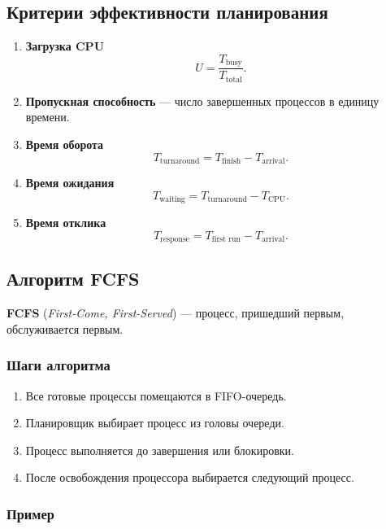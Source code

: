 \documentclass[12pt,a4paper]{article}
\begin{document}
\subsection{Критерии эффективности планирования}

\begin{enumerate}
    \item \textbf{Загрузка CPU}
    \[
        U = \frac{T_{\text{busy}}}{T_{\text{total}}}.
    \]

    \item \textbf{Пропускная способность} --- число завершенных процессов в единицу времени.

    \item \textbf{Время оборота}
    \[
        T_{\text{turnaround}} = T_{\text{finish}} - T_{\text{arrival}}.
    \]

    \item \textbf{Время ожидания}
    \[
        T_{\text{waiting}} = T_{\text{turnaround}} - T_{\text{CPU}}.
    \]

    \item \textbf{Время отклика}
    \[
        T_{\text{response}} = T_{\text{first run}} - T_{\text{arrival}}.
    \]
\end{enumerate}

\subsection{Алгоритм FCFS}

\textbf{FCFS} (\textit{First-Come, First-Served}) --- процесс, пришедший первым, обслуживается первым.

\subsubsection*{Шаги алгоритма}

\begin{enumerate}
    \item Все готовые процессы помещаются в FIFO-очередь.
    \item Планировщик выбирает процесс из головы очереди.
    \item Процесс выполняется до завершения или блокировки.
    \item После освобождения процессора выбирается следующий процесс.
\end{enumerate}

\subsubsection*{Пример}
\end{document}
